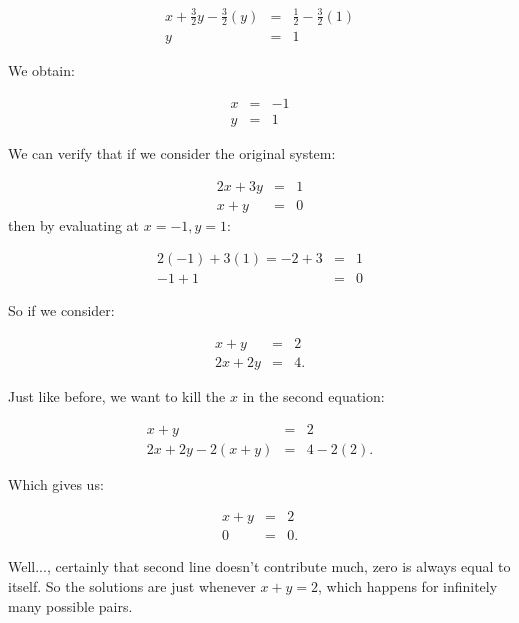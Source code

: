 \begin{example}
\begin{eqnarray*}
x+\frac{3}{2}y-\frac{3}{2}(y)&=&\frac{1}{2}-\frac{3}{2}(1)\\
y&=&1
\end{eqnarray*}

We obtain:

\begin{eqnarray*}
x&=&-1\\
y&=&1
\end{eqnarray*}

We can verify that if we consider the original system:


\begin{eqnarray*}
2x+3y&=&1\\
x+y&=&0
\end{eqnarray*}
 then by evaluating at $x=-1, y=1$:
 
\begin{eqnarray*}
2(-1)+3(1)=-2+3&=&1\\
-1+1&=&0
\end{eqnarray*}
 


\end{example}

\begin{example} So if we consider:

\begin{eqnarray*}
x+y&=&2\\
2x+2y&=&4.
\end{eqnarray*}

Just like before, we want to kill the $x$ in the second equation:

\begin{eqnarray*}
x+y&=&2\\
2x+2y-2(x+y)&=&4-2(2).
\end{eqnarray*}

Which gives us:

\begin{eqnarray*}
x+y&=&2\\
0&=&0.
\end{eqnarray*}

Well..., certainly that second line doesn't contribute much, zero is always equal to itself.  So the solutions are just whenever $x+y=2$, which happens for infinitely many possible pairs.


\end{example}


